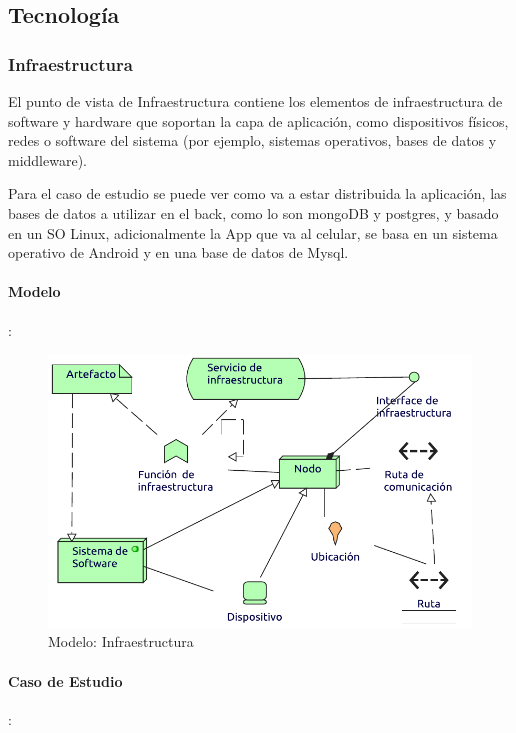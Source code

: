 \subsection{Tecnología}

\subsubsection{Infraestructura}
El punto de vista de Infraestructura contiene los elementos de infraestructura de software y hardware que soportan la capa de aplicación, como dispositivos físicos, redes o software del sistema (por ejemplo, sistemas operativos, bases de datos y middleware).  \vspace{\baselineskip}

Para el caso de estudio se puede ver como va a estar distribuida la aplicación, las bases de datos a utilizar en el back, como lo son mongoDB y postgres, y basado en un SO Linux, adicionalmente la App que va al celular, se basa en un sistema operativo de Android y en una base de datos de Mysql.
\newpage
\paragraph{Modelo}:
\begin{figure}[h!]
	\centering
	\includegraphics[width=0.7\linewidth]{Desarrollo/ArquitecturaEmpresarial/Tecnologia/imgs/insfraestructuraMetamodelo.pdf}
	\caption{Modelo: Infraestructura}
\end{figure}
\paragraph{Caso de Estudio}:

